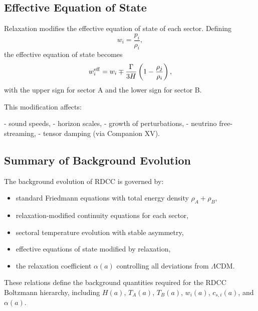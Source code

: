 \documentclass[11pt,a4paper]{article}
\begin{document}
\subsection{Effective Equation of State}

Relaxation modifies the effective equation of state of each sector. Defining
\begin{equation}
w_i = \frac{p_i}{\rho_i},
\end{equation}
the effective equation of state becomes
\begin{equation}
w_i^{\rm eff} = w_i \mp \frac{\Gamma}{3H}\left(1 - \frac{\rho_j}{\rho_i}\right),
\end{equation}
with the upper sign for sector A and the lower sign for sector B.

This modification affects:

- sound speeds,  
- horizon scales,  
- growth of perturbations,  
- neutrino free-streaming,  
- tensor damping (via Companion XV).

\subsection{Summary of Background Evolution}

The background evolution of RDCC is governed by:

\begin{itemize}
\item standard Friedmann equations with total energy density $\rho_A + \rho_B$,
\item relaxation-modified continuity equations for each sector,
\item sectoral temperature evolution with stable asymmetry,
\item effective equations of state modified by relaxation,
\item the relaxation coefficient $\alpha(a)$ controlling all deviations from $\Lambda$CDM.
\end{itemize}

These relations define the background quantities required for the RDCC Boltzmann hierarchy, including $H(a)$, $T_A(a)$, $T_B(a)$, $w_i(a)$, $c_{s,i}(a)$, and $\alpha(a)$.
\end{document}
